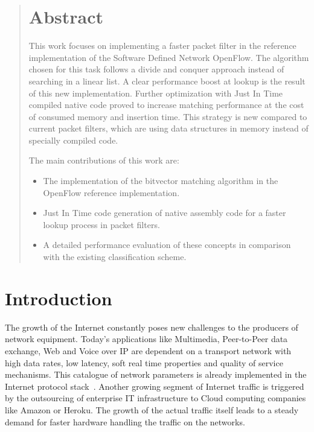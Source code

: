 \documentclass[a4paper,
		12pt,
		parskip=full,
		titlepage
		]{scrartcl}
\begin{document}
\begin{abstract}
\section*{Abstract}
This work focuses on implementing a faster packet filter in the reference 
implementation of the Software Defined Network OpenFlow.
The algorithm chosen for this task follows a divide and conquer approach
instead of searching in a linear list.
A clear performance boost at lookup is the result of this new implementation.
Further optimization with Just In Time compiled native code proved to increase 
matching performance at the cost of consumed memory and insertion time.
This strategy is new compared to current packet filters, which are using 
data structures in memory instead of specially compiled code.

The main contributions of this work are:
\begin{itemize}
    \item The implementation of the bitvector matching algorithm in the 
        OpenFlow reference implementation.
    \item Just In Time code generation of native assembly code for a 
        faster lookup process in packet filters.
    \item A detailed performance evaluation of these concepts in comparison 
        with the existing classification scheme.
\end{itemize}

\end{abstract}

\setcounter{page}{1}
\tableofcontents{}

\pagebreak

\pagestyle{scrheadings}

\section{Introduction}
The growth of the Internet constantly poses new challenges to the producers of network equipment.
Today's applications like Multimedia, Peer-to-Peer data exchange, Web and Voice over IP are dependent on a transport network with
high data rates, low latency, soft real time properties and quality of service mechanisms.
This catalogue of network parameters is already implemented in the Internet protocol stack~\cite{rfc3260, rfc3261, rfc5694, rfc3550}.
Another growing segment of Internet traffic is triggered by the outsourcing of 
enterprise IT infrastructure to Cloud computing companies like Amazon or Heroku.
The growth of the actual traffic itself leads to a steady demand for faster hardware handling the traffic on the networks.
\end{document}
